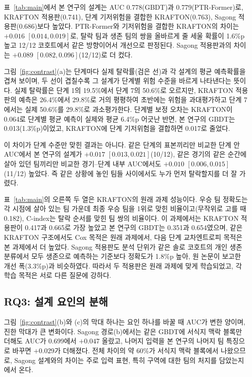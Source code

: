 표~\ref{tab:main}에서 본 연구의 설계는 AUC 0.778(GBDT)과 0.779(PTR-Former)로, KRAFTON 적용판(0.741), 단계 기저위험을 결합한 KRAFTON(0.763), Sagong 적용판(0.686)보다 높았다.
PTR-Former와 기저위험을 결합한 KRAFTON의 차이는 $+0.016$ $[0.014, 0.019]$로, 탈락 팀과 생존 팀의 쌍을 올바르게 줄 세울 확률이 1.6\%p 높고 12/12 코호트에서 같은 방향이어서 개선으로 판정된다.
Sagong 적용판과의 차이는 $+0.089$ $[0.082, 0.096]$(12/12)로 더 컸다.

그림~\ref{fig:contrast}(a)는 단계마다 실제 탈락률(검은 선)과 각 설계의 평균 예측확률을 겹쳐 보이며, 두 선이 겹칠수록 그 설계가 단계별 위험 수준을 바르게 나타낸다는 뜻이다.
실제 탈락률은 단계 1의 19.5\%에서 단계 7의 50.6\%로 오르지만, KRAFTON 적용판의 예측은 26.4\%에서 29.8\%로 거의 평평하여 초반에는 위험을 과대평가하고 단계 7에서는 실제 50.6\%를 29.8\%로 과소평가한다.
단계별 보정 오차는 KRAFTON이 0.064로 단계별 평균 예측이 실제와 평균 6.4\%p 어긋난 반면, 본 연구의 GBDT는 0.013(1.3\%p)이었고, KRAFTON에 단계 기저위험을 결합하면 0.017로 줄었다.

이 차이가 단계 수준만 맞힌 결과는 아니다.
같은 단계의 표본끼리만 비교한 단계 안 AUC에서 본 연구의 설계가 $+0.017$ $[0.013, 0.021]$(10/12), 같은 경기의 같은 순간에 살아 있던 팀끼리만 비교한 경기--단계 내부 AUC에서도 $+0.010$ $[0.006, 0.015]$(11/12) 높았다.
즉 같은 상황에 놓인 팀들 사이에서도 누가 먼저 탈락할지를 더 잘 가렸다.

표~\ref{tab:main}의 오른쪽 두 열은 KRAFTON의 원래 과제 성능이다.
우승 팀 정확도는 각 시점에 살아 있는 팀 가운데 최종 우승 팀을 1위로 맞힌 비율이고(무작위로 고를 때 0.182), C-index는 탈락 순서를 맞힌 팀 쌍의 비율이다.
이 과제에서는 KRAFTON 적용판이 0.417과 0.665로 가장 높았고 본 연구의 GBDT는 0.351과 0.654였으며, 같은 KRAFTON 구조에서도 Cox 목적은 원래 과제에서, 다음 단계 교차엔트로피 목적은 본 과제에서 더 높았다.
Sagong 적용판도 분석 단위가 같은 솔로 코호트의 개인 생존 분류에서 모두 생존으로 예측하는 기준보다 정확도가 1.8\%p 높아, 원 논문이 보고한 개선 폭(3.3\%p)과 비슷하였다.
따라서 두 적용판은 원래 과제에 맞게 학습되었고, 각 학습 목적은 서로 다른 질문에 강하다.

\subsection{RQ3: 설계 요인의 분해}
\label{sec:results:rq3}

그림~\ref{fig:contrast}(b)와 (c)의 막대 하나는 요인 하나를 바꿀 때 AUC가 변한 양이며, 진한 막대가 큰 변화이다.
Sagong 경로(b)에서는 같은 GBDT에 서식지 맥락 블록만 더해도 AUC가 0.699에서 $+0.047$ 올랐고, 나머지 입력을 본 연구의 나머지 팀 특징으로 바꾸면 $+0.029$가 더해졌다.
전체 차이의 약 60\%가 서식지 맥락 블록에서 나왔으므로, Sagong 설계와의 차이는 주로 입력 표현, 특히 구역에 대한 팀의 처지를 담았는지에서 온다.

